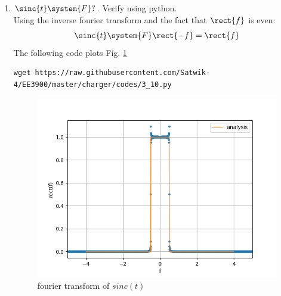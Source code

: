 \documentclass[journal,12pt,twocolumn]{IEEEtran}
\renewcommand\thesection{\arabic{section}}
\begin{document}
\begin{enumerate}[label=\thesection.\arabic*
,ref=\thesection.\theenumi]
 \item 
$	 \sinc{t}\system{F} ?$.  Verify using python.
\\\solution Using the inverse fourier transform and the fact that $\rect{f}$ is even:
\begin{align}
    \sinc{t}\system{F}\rect{-f}=\rect{f}
\end{align}
  The following code plots Fig. \ref{fig:sinc-ft}
	\begin{lstlisting}
wget https://raw.githubusercontent.com/Satwik-4/EE3900/master/charger/codes/3_10.py
\end{lstlisting}
	\begin{figure}[h!]
	    \centering
	    \includegraphics[width=\columnwidth]{figures/sinc-ft.png}
	    \caption{fourier transform of $sinc(t)$ }
	    \label{fig:sinc-ft}
	\end{figure}
\end{enumerate}
\end{document}
